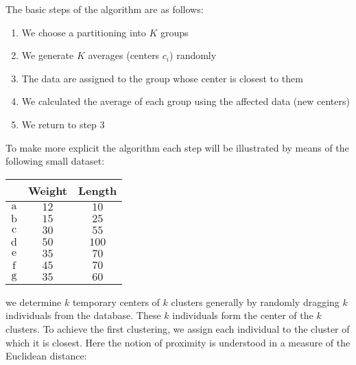 	The basic steps of the algorithm are as follows:
	\begin{enumerate}
		\item We choose a partitioning into $K$ groups

		\item We generate $K$ averages (centers $c_i$) randomly

		\item  The data are assigned to the group whose center is closest to them

		\item We calculated the average of each group using the affected data (new centers)

		\item We return to step 3
	\end{enumerate}	
	To make more explicit the algorithm each step will be illustrated by means of the following small dataset:
	\begin{table}[H]
		\centering
		\begin{tabular}{|c|c|c|}
		\hline
		\rowcolor[HTML]{9B9B9B} 
		\multicolumn{1}{|l|}{\cellcolor[HTML]{9B9B9B}\textbf{Object}} & \multicolumn{1}{l|}{\cellcolor[HTML]{9B9B9B}\textbf{Weight}} & \multicolumn{1}{l|}{\cellcolor[HTML]{9B9B9B}\textbf{Length}} \\ \hline
		$\mathrm{a}$ & $12$ & $10$ \\ \hline
		$\mathrm{b}$ & $15$ & $25$ \\ \hline
		$\mathrm{c}$ & $30$ & $55$ \\ \hline
		$\mathrm{d}$ & $50$ & $100$ \\ \hline
		$\mathrm{e}$ & $35$ & $70$ \\ \hline
		$\mathrm{f}$ & $45$ & $70$ \\ \hline
		$\mathrm{g}$ & $35$ & $60$ \\ \hline
		\end{tabular}
	\end{table}
	we determine $k$ temporary centers of $k$ clusters generally by randomly dragging $k$ individuals from the database. These $k$ individuals form the center of the $k$ clusters. To achieve the first clustering, we assign each individual to the cluster of which it is closest. Here the notion of proximity is understood in a measure of the Euclidean distance:
	
